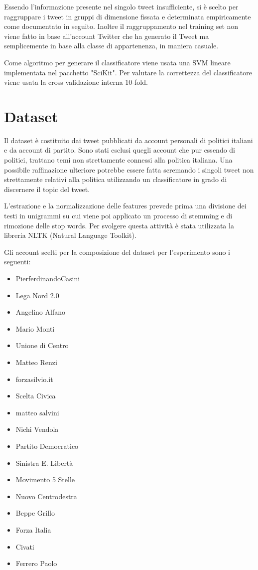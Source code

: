 \documentclass{article}
\begin{document}
Essendo l'informazione presente nel singolo tweet insufficiente, si è scelto per raggruppare i tweet in gruppi di dimensione fissata e determinata empiricamente come documentato in seguito. Inoltre il raggruppamento nel training set non viene fatto in base all'account Twitter che ha generato il Tweet ma semplicemente in base alla classe di appartenenza, in maniera casuale.

Come algoritmo per generare il classificatore viene usata una SVM lineare implementata nel pacchetto "SciKit". Per valutare la correttezza del classificatore viene usata la cross validazione interna 10-fold.

\section{Dataset}

Il dataset è costituito dai tweet pubblicati da account personali di politici italiani e da account di partito. Sono stati esclusi quegli account che pur essendo di politici, trattano temi non strettamente connessi alla politica italiana. Una possibile raffinazione ulteriore potrebbe essere fatta scremando i singoli tweet non strettamente relativi alla politica utilizzando un classificatore in grado di discernere il topic del tweet. 

L'estrazione e la normalizzazione delle features prevede prima una divisione dei testi in unigrammi su cui viene poi applicato un processo di stemming e di rimozione delle stop words. Per svolgere questa attività è stata utilizzata la libreria NLTK (Natural Language Toolkit).

Gli account scelti per la composizione del dataset per l'esperimento sono i seguenti:

\begin{itemize}
\item PierferdinandoCasini
\item Lega Nord 2.0
\item Angelino Alfano
\item Mario Monti
\item Unione di Centro
\item Matteo Renzi
\item forzasilvio.it
\item Scelta Civica
\item matteo salvini
\item Nichi Vendola
\item Partito Democratico
\item Sinistra E. Libertà
\item Movimento 5 Stelle 
\item Nuovo Centrodestra
\item Beppe Grillo
\item Forza Italia
\item Civati
\item Ferrero Paolo

\end{itemize}
\end{document}
